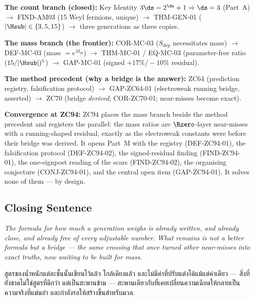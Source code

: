 \documentclass[12pt, a4paper]{article}
\begin{document}
\begin{genealogybox}[title={How ZC94 Sits in the Corpus}]
\textbf{The count branch (closed):}
Key Identity $3\ds=2^{\ds}+1\Rightarrow\ds=3$ (Part~A) $\to$ FIND-AM03 (15
Weyl fermions, unique) $\to$ THM-GEN-01 ($|\Hsub|\in\{3,5,15\}$) $\to$ three
generations as three copies.

\smallskip
\textbf{The mass branch (the frontier):}
COR-MC-03 ($S_{\mathrm{dep}}$ necessitates mass) $\to$ DEF-MC-03
(mass $=e^{M_H}$) $\to$ THM-MC-01 / EQ-MC-03 (parameter-free ratio
$(15/|\Hsub|)^5$) $\to$ GAP-MC-01 (signed $+17\%/{-}10\%$ residual).

\smallskip
\textbf{The method precedent (why a bridge is the answer):}
ZC64 (prediction registry, falsification protocol) $\to$ GAP-ZC64-01
(electroweak running bridge, asserted) $\to$ ZC70 (bridge \emph{derived};
COR-ZC70-01; near-misses become exact).

\smallskip
\textbf{Convergence at ZC94:}
ZC94 places the mass branch beside the method precedent and registers the
parallel: the mass ratios are $\Rzero$-layer near-misses with a running-shaped
residual, exactly as the electroweak constants were before their bridge was
derived. It opens Part~M with the registry (DEF-ZC94-01), the falsification
protocol (DEF-ZC94-02), the signed-residual finding (FIND-ZC94-01), the
one-signpost reading of the scars (FIND-ZC94-02), the organising conjecture
(CONJ-ZC94-01), and the central open item (GAP-ZC94-01). It solves none of
them --- by design.
\end{genealogybox}

\subsection{Closing Sentence}

\bigskip
\begin{center}
\textit{%
  The formula for how much a generation weighs is already written, and already
  close, and already free of every adjustable number. What remains is not a
  better formula but a bridge --- the same crossing that once turned other
  near-misses into exact truths, now waiting to be built for mass.}

\medskip
{\thaifont
สูตรของน้ำหนักแต่ละชั้นนั้นเขียนไว้แล้ว ใกล้เคียงแล้ว และไม่มีค่าที่ปรับแต่งได้แม้แต่ค่าเดียว ---
สิ่งที่ยังขาดไม่ใช่สูตรที่ดีกว่า แต่เป็นสะพานข้าม ---
สะพานเดียวกับที่เคยเปลี่ยนความเฉียดให้กลายเป็นความจริงที่แม่นยำ และกำลังรอให้สร้างขึ้นสำหรับมวล.}
\end{center}
\end{document}
